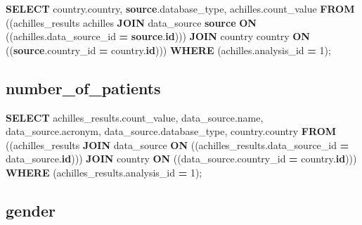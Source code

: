 \documentclass[
]{book}
\newenvironment{Shaded}{\begin{snugshade}}{\end{snugshade}}
\newcommand{\DecValTok}[1]{\textcolor[rgb]{0.00,0.00,0.81}{#1}}
\newcommand{\KeywordTok}[1]{\textcolor[rgb]{0.13,0.29,0.53}{\textbf{#1}}}
\newcommand{\NormalTok}[1]{#1}
\newcommand{\OperatorTok}[1]{\textcolor[rgb]{0.81,0.36,0.00}{\textbf{#1}}}
\begin{document}
\begin{Shaded}
\begin{Highlighting}[]
\KeywordTok{SELECT}\NormalTok{ country.country,}
   \KeywordTok{source}\NormalTok{.database\_type,}
\NormalTok{   achilles.count\_value}
  \KeywordTok{FROM}\NormalTok{ ((achilles\_results achilles}
    \KeywordTok{JOIN}\NormalTok{ data\_source }\KeywordTok{source} \KeywordTok{ON}\NormalTok{ ((achilles.data\_source\_id }\OperatorTok{=} \KeywordTok{source}\NormalTok{.}\KeywordTok{id}\NormalTok{)))}
    \KeywordTok{JOIN}\NormalTok{ country country }\KeywordTok{ON}\NormalTok{ ((}\KeywordTok{source}\NormalTok{.country\_id }\OperatorTok{=}\NormalTok{ country.}\KeywordTok{id}\NormalTok{)))}
 \KeywordTok{WHERE}\NormalTok{ (achilles.analysis\_id }\OperatorTok{=} \DecValTok{1}\NormalTok{);}
\end{Highlighting}
\end{Shaded}

\hypertarget{number_of_patients}{%
\subsection*{number\_of\_patients}\label{number_of_patients}}

\begin{Shaded}
\begin{Highlighting}[]
\KeywordTok{SELECT}\NormalTok{ achilles\_results.count\_value,}
\NormalTok{   data\_source.name,}
\NormalTok{   data\_source.acronym,}
\NormalTok{   data\_source.database\_type,}
\NormalTok{   country.country}
  \KeywordTok{FROM}\NormalTok{ ((achilles\_results}
    \KeywordTok{JOIN}\NormalTok{ data\_source }\KeywordTok{ON}\NormalTok{ ((achilles\_results.data\_source\_id }\OperatorTok{=}\NormalTok{ data\_source.}\KeywordTok{id}\NormalTok{)))}
    \KeywordTok{JOIN}\NormalTok{ country }\KeywordTok{ON}\NormalTok{ ((data\_source.country\_id }\OperatorTok{=}\NormalTok{ country.}\KeywordTok{id}\NormalTok{)))}
 \KeywordTok{WHERE}\NormalTok{ (achilles\_results.analysis\_id }\OperatorTok{=} \DecValTok{1}\NormalTok{);}
\end{Highlighting}
\end{Shaded}

\hypertarget{gender}{%
\subsection*{gender}\label{gender}}
\end{document}

